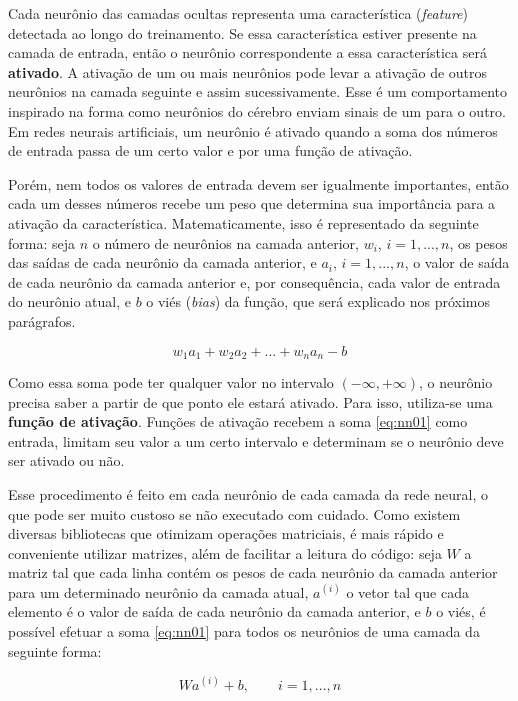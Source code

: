 Cada neurônio das camadas ocultas representa uma característica (\textit{feature}) detectada ao longo do treinamento.
Se essa característica estiver presente na camada de entrada, então o neurônio correspondente a essa característica será \textbf{ativado}.
A ativação de um ou mais neurônios pode levar a ativação de outros neurônios na camada seguinte e assim sucessivamente. Esse é um comportamento inspirado na forma como neurônios do cérebro enviam sinais de um para o outro.
Em redes neurais artificiais, um neurônio é ativado quando a soma dos números de entrada passa de um certo valor e por uma função de ativação.

Porém, nem todos os valores de entrada devem ser igualmente importantes, então cada um desses números recebe um peso que determina sua importância para a ativação da característica.
Matematicamente, isso é representado da seguinte forma:
seja $n$ o número de neurônios na camada anterior, $w_{i}$, $i = 1, ..., n$, os pesos das saídas de cada neurônio da camada anterior, e $a_{i}$, $i = 1, ..., n$, o valor de saída de cada neurônio da camada anterior e, por consequência, cada valor de entrada do neurônio atual, e $b$ o viés (\textit{bias}) da função, que será explicado nos próximos parágrafos.

\begin{equation} \label{eq:nn01}
w_{1}a_{1} + w_{2}a_{2} + ... + w_{n}a_{n} - b
\end{equation}

Como essa soma pode ter qualquer valor no intervalo $(-\infty, +\infty)$, o neurônio precisa saber a partir de que ponto ele estará ativado.
Para isso, utiliza-se uma \textbf{função de ativação}.
Funções de ativação recebem a soma \ref{eq:nn01} como entrada, limitam seu valor a um certo intervalo 
e determinam se o neurônio deve ser ativado ou não.

Esse procedimento é feito em cada neurônio de cada camada da rede neural, o que pode ser muito custoso se não executado com cuidado.
Como existem diversas bibliotecas que otimizam operações matriciais, é mais rápido e conveniente utilizar matrizes, além de facilitar a leitura do código:
seja $W$ a matriz tal que cada linha contém os pesos de cada neurônio da camada anterior para um determinado neurônio da camada atual, $a^{(i)}$ o vetor tal que cada elemento é o valor de saída de cada neurônio da camada anterior, e $b$ o viés, é possível efetuar a soma \ref{eq:nn01} para todos os neurônios de uma camada da seguinte forma:

\begin{equation} \label{eq:nn02}
Wa^{(i)} + b, \qquad i = 1, ..., n
\end{equation}

